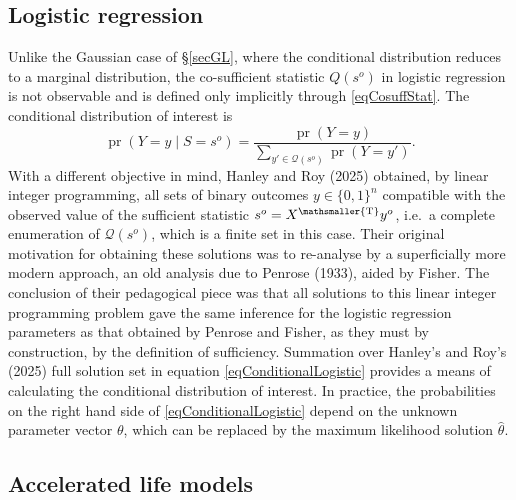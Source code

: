 \documentclass[10pt, reqno]{amsart}
\numberwithin{equation}{section}
\newcommand{\cosuff}{\mathcal{Q}}
\newcommand{\pr}{\mathop{\mathrm{pr}}}
\newcommand{\T}{{\mathsmaller {\rm T}}}
\begin{document}
\subsection{Logistic regression}\label{secLogistic}

Unlike the Gaussian case of \S \ref{secGL}, where the conditional distribution reduces to a marginal distribution, the co-sufficient statistic $Q(s^o)$ in logistic regression is not observable and is defined only implicitly through \eqref{eqCosuffStat}. The conditional distribution of interest is
%
\begin{equation}\label{eqConditionalLogistic}
	\pr(Y=y \mid S=s^o) = \frac{\pr(Y=y)}{\sum_{y'\in \cosuff(s^o)}\pr(Y=y')}.
\end{equation}
%
With a different objective in mind, Hanley and Roy (2025) obtained, by linear integer programming, all sets of binary outcomes $y\in\{0,1\}^n$ compatible with the observed value of the sufficient statistic $s^o=X^\T y^o$, i.e.~a complete enumeration of $\cosuff(s^o)$, which is a finite set in this case. Their original motivation for obtaining these solutions was to re-analyse by a superficially more modern approach, an old analysis due to Penrose (1933), aided by Fisher. The conclusion of their pedagogical piece was that all solutions to this linear integer programming problem gave the same inference for the logistic regression parameters as that obtained by Penrose and Fisher, as they must by construction, by the definition of sufficiency. Summation over Hanley's and Roy's (2025) full solution set in equation \eqref{eqConditionalLogistic} provides a means of calculating the conditional distribution of interest. In practice, the probabilities on the right hand side of \eqref{eqConditionalLogistic} depend on the unknown parameter vector $\theta$, which can be replaced by the maximum likelihood solution $\hat\theta$.


\subsection{Accelerated life models}\label{secAL}
\end{document}
